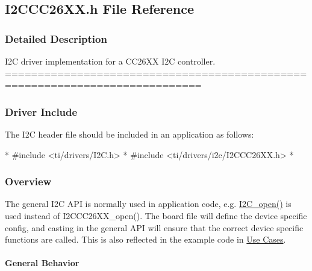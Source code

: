 \subsection{I2\-C\-C\-C26\-X\-X.\-h File Reference}
\label{_i2_c_c_c26_x_x_8h}


\subsubsection{Detailed Description}
I2\-C driver implementation for a C\-C26\-X\-X I2\-C controller. ============================================================================

\subsubsection*{Driver Include}

The I2\-C header file should be included in an application as follows\-: 
\begin{DoxyCode}
*  #include <ti/drivers/I2C.h>
*  #include <ti/drivers/i2c/I2CCC26XX.h>
*  
\end{DoxyCode}


\subsubsection*{Overview}

The general I2\-C A\-P\-I is normally used in application code, e.\-g. \hyperlink{_i2_c_8h_ae1aa99e1fee4517406018e10025cca0e}{I2\-C\-\_\-open()} is used instead of I2\-C\-C\-C26\-X\-X\-\_\-open(). The board file will define the device specific config, and casting in the general A\-P\-I will ensure that the correct device specific functions are called. This is also reflected in the example code in \hyperlink{_i2_c_c_c26_x_x_8h_I2C_USE_CASES}{Use Cases}.

\paragraph*{General Behavior}

